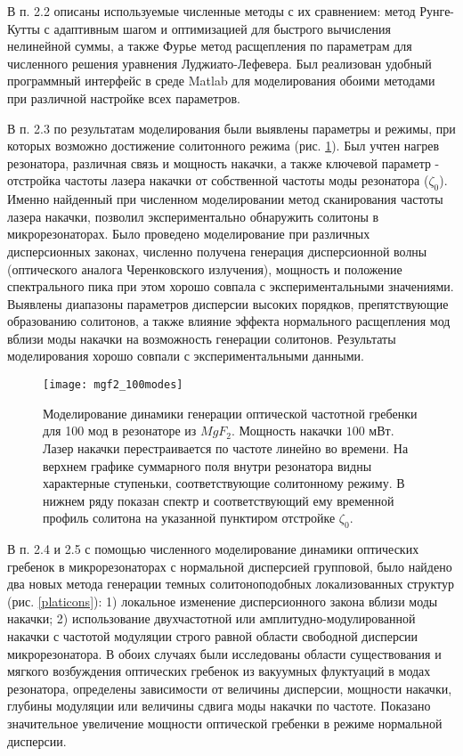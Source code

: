 В п. 2.2 описаны используемые численные методы с их сравнением: метод Рунге-Кутты с адаптивным шагом и оптимизацией для быстрого вычисления нелинейной суммы, а также Фурье метод расщепления по параметрам для численного решения уравнения Луджиато-Лефевера. Был реализован удобный программный интерфейс в среде Matlab для моделирования обоими методами при различной настройке всех параметров.

В п. 2.3 по результатам моделирования были выявлены параметры и режимы, при которых возможно достижение солитонного режима (рис. \ref{100modes}). Был учтен нагрев резонатора, различная связь и мощность накачки, а также ключевой параметр - отстройка частоты лазера накачки от собственной частоты моды резонатора ($\zeta_0$). Именно найденный при численном моделировании метод сканирования частоты лазера накачки, позволил экспериментально обнаружить солитоны в микрорезонаторах. Было проведено моделирование при различных дисперсионных законах, численно получена генерация дисперсионной волны (оптического аналога Черенковского излучения), мощность и положение спектрального пика при этом хорошо совпала с экспериментальными значениями. Выявлены диапазоны параметров дисперсии высоких порядков, препятствующие образованию солитонов, а также влияние эффекта нормального расщепления мод вблизи моды накачки на возможность генерации солитонов. Результаты моделирования хорошо совпали с экспериментальными данными.

\begin{figure}
  \centering
  \texttt{[image: mgf2\_100modes]}
  \caption{Моделирование динамики генерации оптической частотной гребенки для 100 мод в резонаторе из $MgF_2$. Мощность накачки $100$ мВт. Лазер накачки перестраивается по частоте линейно во времени. На верхнем графике суммарного поля внутри резонатора видны характерные ступеньки, соответствующие солитонному режиму. В нижнем ряду показан спектр и соответствующий ему временной профиль солитона на указанной пунктиром отстройке $\zeta_0$.}
  \label{100modes}
\end{figure}

В п. 2.4 и 2.5 с помощью численного моделирование динамики оптических гребенок в микрорезонаторах с нормальной дисперсией групповой, было найдено два новых метода генерации темных солитоноподобных локализованных структур (рис. \ref{platicons}): 1) локальное изменение дисперсионного закона вблизи моды накачки; 2) использование двухчастотной или амплитудно-модулированной накачки с частотой модуляции строго равной области свободной дисперсии микрорезонатора. В обоих случаях были исследованы области существования и мягкого возбуждения оптических гребенок из вакуумных флуктуаций в модах резонатора, определены зависимости от величины дисперсии, мощности накачки, глубины модуляции или величины сдвига моды накачки по частоте. Показано значительное увеличение мощности оптической гребенки в режиме нормальной дисперсии.

